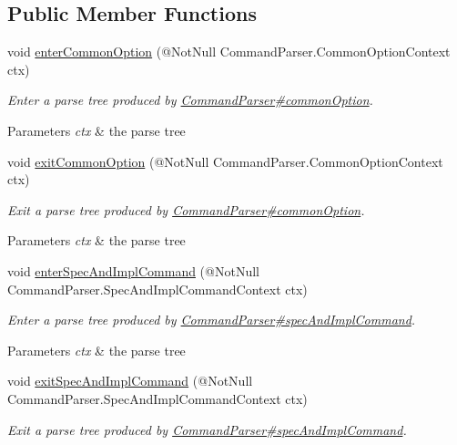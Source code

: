 \subsection*{Public Member Functions}
\begin{DoxyCompactItemize}
\item 
void \hyperlink{classedu_1_1udel_1_1cis_1_1vsl_1_1civl_1_1run_1_1common_1_1CommandBaseListener_ab68d10d4d5f424612bad1e70a9cab058}{enter\+Common\+Option} (@Not\+Null Command\+Parser.\+Common\+Option\+Context ctx)
\begin{DoxyCompactList}\small\item\em Enter a parse tree produced by \hyperlink{}{Command\+Parser\#common\+Option}.


\begin{DoxyParams}{Parameters}
{\em ctx} & the parse tree\\
\hline
\end{DoxyParams}
 \end{DoxyCompactList}\item 
void \hyperlink{classedu_1_1udel_1_1cis_1_1vsl_1_1civl_1_1run_1_1common_1_1CommandBaseListener_a774677493e4501216ec745826d8877bf}{exit\+Common\+Option} (@Not\+Null Command\+Parser.\+Common\+Option\+Context ctx)
\begin{DoxyCompactList}\small\item\em Exit a parse tree produced by \hyperlink{}{Command\+Parser\#common\+Option}.


\begin{DoxyParams}{Parameters}
{\em ctx} & the parse tree\\
\hline
\end{DoxyParams}
 \end{DoxyCompactList}\item 
void \hyperlink{classedu_1_1udel_1_1cis_1_1vsl_1_1civl_1_1run_1_1common_1_1CommandBaseListener_adc5a61ef080a7eab6f627e8f19965a8e}{enter\+Spec\+And\+Impl\+Command} (@Not\+Null Command\+Parser.\+Spec\+And\+Impl\+Command\+Context ctx)
\begin{DoxyCompactList}\small\item\em Enter a parse tree produced by \hyperlink{}{Command\+Parser\#spec\+And\+Impl\+Command}.


\begin{DoxyParams}{Parameters}
{\em ctx} & the parse tree\\
\hline
\end{DoxyParams}
 \end{DoxyCompactList}\item 
void \hyperlink{classedu_1_1udel_1_1cis_1_1vsl_1_1civl_1_1run_1_1common_1_1CommandBaseListener_afcdee99c10b373d08575db0a23f2640d}{exit\+Spec\+And\+Impl\+Command} (@Not\+Null Command\+Parser.\+Spec\+And\+Impl\+Command\+Context ctx)
\begin{DoxyCompactList}\small\item\em Exit a parse tree produced by \hyperlink{}{Command\+Parser\#spec\+And\+Impl\+Command}.



\end{DoxyCompactList}
\end{DoxyCompactItemize}
